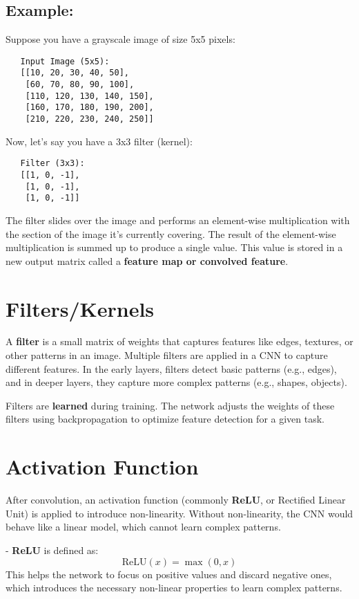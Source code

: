\documentclass[10pt]{article}
\begin{document}
\subsection{ Example:}
Suppose you have a grayscale image of size 5x5 pixels:

\begin{verbatim}
   Input Image (5x5):
   [[10, 20, 30, 40, 50],
    [60, 70, 80, 90, 100],
    [110, 120, 130, 140, 150],
    [160, 170, 180, 190, 200],
    [210, 220, 230, 240, 250]]
\end{verbatim}

Now, let’s say you have a 3x3 filter (kernel):

\begin{verbatim}
   Filter (3x3):
   [[1, 0, -1],
    [1, 0, -1],
    [1, 0, -1]]
\end{verbatim}

The filter slides over the image and performs an element-wise multiplication with the section of the image it's currently covering. The result of the element-wise multiplication is summed up to produce a single value. This value is stored in a new output matrix called a {\bf feature map or    convolved feature}.

\section{{\bf Filters/Kernels}}
A {\bf filter} is a small matrix of weights that captures features like edges, textures, or other patterns in an image. Multiple filters are applied in a CNN to capture different features. In the early layers, filters detect basic patterns (e.g., edges), and in deeper layers, they capture more complex patterns (e.g., shapes, objects).

Filters are {\bf learned} during training. The network adjusts the weights of these filters using backpropagation to optimize feature detection for a given task.

\section{{\bf Activation Function}}
After convolution, an activation function (commonly {\bf ReLU}, or Rectified Linear Unit) is applied to introduce non-linearity. Without non-linearity, the CNN would behave like a linear model, which cannot learn complex patterns.

- {\bf ReLU} is defined as:
  $$
  \text{ReLU}(x) = \max(0, x)
  $$
This helps the network to focus on positive values and discard negative ones, which introduces the necessary non-linear properties to learn complex patterns.
\end{document}
